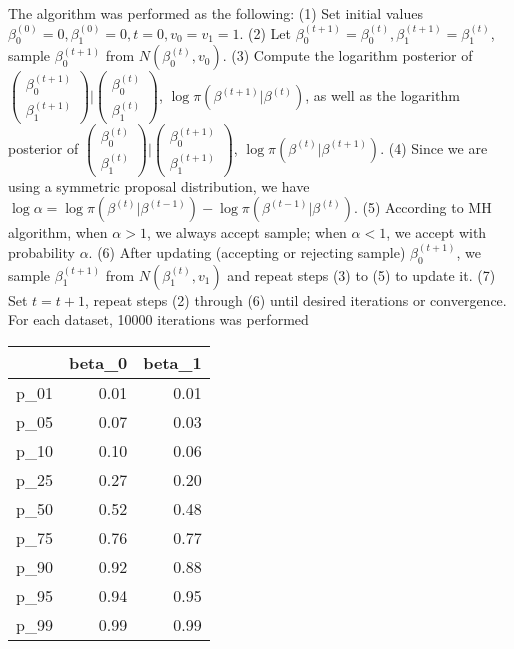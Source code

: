 \documentclass[12pt]{article}
\begin{document}
The algorithm was performed as the following: \newline
(1) Set initial values $\beta_0^{(0)} = 0, \beta_1^{(0)} = 0, t = 0, v_0 = v_1 = 1$. \newline
(2) Let $\beta_0^{(t+1)} = \beta_0^{(t)}, \beta_1^{(t+1)} = \beta_1^{(t)}$, sample $\beta_0^{(t+1)}$ from $N(\beta_0^{(t)}, v_0)$. \newline
(3) Compute the logarithm posterior of $\begin{pmatrix} \beta_0^{(t+1)} \\ \beta_1^{(t+1)} \end{pmatrix} | \begin{pmatrix} \beta_0^{(t)} \\ \beta_1^{(t)} \end{pmatrix}$, $\log \pi(\beta^{(t+1)}|\beta^{(t)})$, as well as the logarithm posterior of $\begin{pmatrix} \beta_0^{(t)} \\ \beta_1^{(t)} \end{pmatrix} | \begin{pmatrix} \beta_0^{(t+1)} \\ \beta_1^{(t+1)} \end{pmatrix}$, $\log \pi(\beta^{(t)}|\beta^{(t+1)})$. \newline
(4) Since we are using a symmetric proposal distribution, we have $\log\alpha = \log \pi(\beta^{(t)}|\beta^{(t-1)}) - \log \pi(\beta^{(t-1)}|\beta^{(t)})$.
(5) According to MH algorithm, when $\alpha > 1$, we always accept sample; when $\alpha < 1$, we accept with probability $\alpha$. \newline
(6) After updating (accepting or rejecting sample) $\beta_0^{(t+1)}$, we sample $\beta_1^{(t+1)}$ from $N(\beta_1^{(t)}, v_1)$ and repeat steps (3) to (5) to update it. \newline
(7) Set $t = t+1$, repeat steps (2) through (6) until desired iterations or convergence. \newline \newline
For each dataset, 10000 iterations was performed




\begin{table}[ht]
\centering
\begin{tabular}{rrr}
  \hline
 & beta\_0 & beta\_1 \\ 
  \hline
p\_01 & 0.01 & 0.01 \\ 
  p\_05 & 0.07 & 0.03 \\ 
  p\_10 & 0.10 & 0.06 \\ 
  p\_25 & 0.27 & 0.20 \\ 
  p\_50 & 0.52 & 0.48 \\ 
  p\_75 & 0.76 & 0.77 \\ 
  p\_90 & 0.92 & 0.88 \\ 
  p\_95 & 0.94 & 0.95 \\ 
  p\_99 & 0.99 & 0.99 \\ 
   \hline
\end{tabular}
\end{table}
\end{document}
